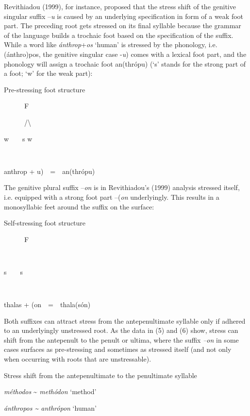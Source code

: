 \documentclass[a4paper]{article}
\begin{document}
Revithiadou (1999), for instance, proposed that the stress shift of the genitive singular suffix –\textit{u} is caused by an underlying specification in form of a weak foot part. The preceding root gets stressed on its final syllable because the grammar of the language builds a trochaic foot based on the specification of the suffix. While a word like \textit{ánthrop}+\textit{os} ‘human’ is stressed by the phonology, i.e. (ánthro)pos, the genitive singular case -\textit{u}) comes with a lexical foot part, and the phonology will assign a trochaic foot an(thrópu) (‘s’ stands for the strong part of a foot; ‘w’ for the weak part):

\ea Pre-stressing foot structure

{
\ \ \ \ \ \   F}

{
\ \ \ \ \ \   /{\textbackslash}}

{
w\ \ \ \   s  w}

{
 {\textbar}\ \ \ \   {\textbar}  {\textbar}}

{
anthrop + u)\ \ =\ \ an(thrópu)}
\z

The genitive plural suffix –\textit{on} is in Revithiadou’s (1999) analysis stressed itself, i.e. equipped with a strong foot part –(\textit{on} underlyingly. This results in a monosyllabic feet around the suffix on the surface:


\ea Self-stressing foot structure

{
\ \ \ \ \ \   F}

{
\ \ \ \ \ \   {\textbar}}

{
 s\ \ \ \   s}

{
{\textbar}\ \ \ \   {\textbar}\ \ }

{
thalas + (on\ \ =\ \ thala(són)}
\z

Both suffixes can attract stress from the antepenultimate syllable only if adhered to an underlyingly unstressed root. As the data in (5) and (6) show, stress can shift from the antepenult to the penult or ultima, where the suffix \textit{–on} in some cases surfaces as pre-stressing and sometimes as stressed itself (and not only when occurring with roots that are unstressable).


\ea Stress shift from the antepenultimate to the penultimate syllable

{
\textit{méthodos} \~{} \textit{methódon} ‘method’}

{
\textit{ánthropos \~{} anthrópon} ‘human’}
\z
\end{document}
